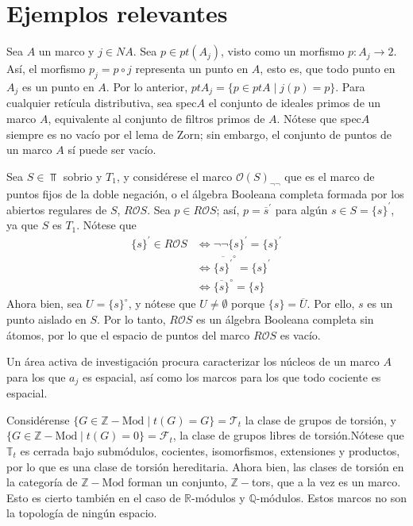 \chapter{Ejemplos relevantes}
Sea $A$ un marco y $j\in NA$. Sea $p\in pt(A_j)$, visto como un morfismo $p:A_j\to 2$. Así, el morfismo $p_j=p\circ j$ representa un punto en $A$, esto es, que todo punto en $A_j$ es un punto en $A$. Por lo anterior, $ptA_j=\{p\in ptA \mid j(p)=p\}$.
 Para cualquier retícula distributiva, sea spec$A$ el conjunto de ideales primos de un marco $A$, equivalente al conjunto de filtros primos de $A$. Nótese que spec$A$ siempre es no vacío por el lema de Zorn; sin embargo, el conjunto de puntos de un marco $A$ sí puede ser vacío.
 
 \begin{exa}
     Sea $S\in \Top$ sobrio y $T_1$, y considérese el marco $\mathcal{O}(S)_{\neg \neg}$ que es el marco de puntos fijos de la doble negación, o el álgebra Booleana completa formada por los abiertos regulares de $S$, $R\mathcal{O}S$.
     Sea $p\in R\mathcal{O}S$; así, $p=\overline{s}^{\prime}$ para algún $s\in S=\{s\}^{\prime}$, ya que $S$ es $T_1$. Nótese que \begin{align*}
         \{s\}^{\prime}\in R\mathcal{O}S&\iff \neg\neg \{s\}^\prime =\{s\}^\prime\\
         &\iff \overline{\{s\}^\prime}^\circ=\{s\}^\prime\\
         &\iff \overline{\{s\}}^\circ=\{s\}
     \end{align*}
Ahora bien, sea $U=\{s\}^\circ$, y nótese que $U\neq\emptyset$ porque $\{s\}=\overline{U}$. Por ello, $s$ es un punto aislado en $S$.  Por lo tanto, $R\mathcal{O}S$ es un álgebra Booleana completa sin átomos, por lo que el espacio de puntos del marco $R\mathcal{O}S$ es vacío.
 \end{exa}
 Un área activa de investigación procura caracterizar los núcleos de un marco $A$ para los que $a_j$ es espacial, así como los marcos para los que todo cociente es espacial.
 
 \begin{exa}
 Considérense $\{G\in \mathbb{Z}-\text{Mod} \mid t(G)=G\}=\mathscr{T}_t$ la clase de grupos de torsión, y $\{G\in\mathbb{Z}-\text{Mod}\mid t(G)=0\}=\mathscr{F}_t$, la clase de grupos libres de torsión.Nótese que $\mathbb{T}_t$ es cerrada bajo submódulos, cocientes, isomorfismos, extensiones y productos, por lo que es una clase de torsión hereditaria.
 Ahora bien, las clases de torsión en la categoría de $\mathbb{Z}-\text{Mod}$ forman un conjunto, $\mathbb{Z}-$tors, que a la vez es un marco. Esto es cierto también en el caso de $\mathbb{R}$-módulos y $\mathbb{Q}$-módulos.
 Estos marcos no son la topología de ningún espacio.
 \end{exa}

